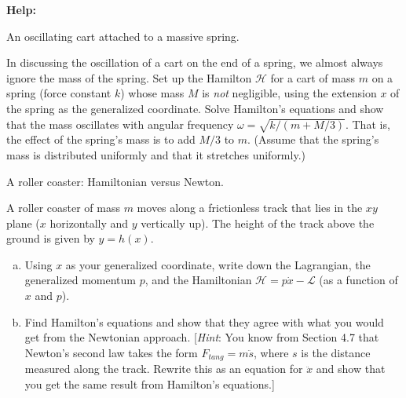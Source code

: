 \documentclass[11pt,letterpaper,boxed]{../hmcpsetrhino}
\def\Lagr{\mathcal{L}}
\def\Ham{\mathcal{H}}
\begin{document}
\textbf{Help:}

\begin{problem}[i]
An oscillating cart attached to a massive spring.

\begin{problem}[13.6]
In discussing the oscillation of a cart on the end of a spring, we almost always ignore the mass of the spring. Set up the Hamilton $\Ham$ for a cart of mass $m$ on a spring (force constant $k$) whose mass $M$ is \textit{not} negligible, using the extension $x$ of the spring as the generalized coordinate. Solve Hamilton's equations and show that the mass oscillates with angular frequency $\omega = \sqrt{k/(m + M/3)}$. That is, the effect of the spring's mass is to add $M/3$ to $m$. (Assume that the spring's mass is distributed uniformly and that it stretches uniformly.)
\end{problem}
\end{problem}
\begin{solution}


\vfill
\end{solution}


\newpage

\begin{problem}[ii]
A roller coaster: Hamiltonian versus Newton.

\begin{problem}[13.7]
A roller coaster of mass $m$ moves along a frictionless track that lies in the $x y$ plane ($x$ horizontally and $y$ vertically up). The height of the track above the ground is given by $y = h(x)$. 
\begin{enumerate}[(a)]
\item Using $x$ as your generalized coordinate, write down the Lagrangian, the generalized momentum $p$, and the Hamiltonian $\Ham = p\dot x - \Lagr$ (as a function of $x$ and $p$).

\item Find Hamilton's equations and show that they agree with what you would get from the Newtonian approach. [\textit{Hint}: You know from Section 4.7 that Newton's second law takes the form $F_{tang} = m \ddot s$, where $s$ is the distance measured along the track. Rewrite this as an equation for $\ddot x$ and show that you get the same result from Hamilton's equations.]
\end{enumerate}
\end{problem}
\end{problem}
\begin{solution}


\vfill
\end{solution}
\end{document}
